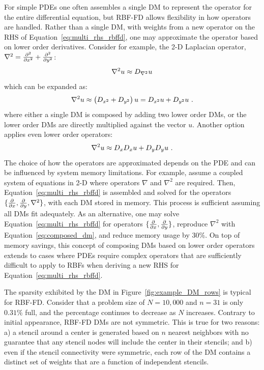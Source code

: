 \documentclass[11pt]{report}
\begin{document}
{For simple PDEs one often assembles a single DM to represent the operator for the entire differential equation, but RBF-FD allows flexibility in how operators are handled. Rather than a single DM, with weights from a new operator on the RHS of Equation~\ref{eq:multi_rhs_rbffd}, one may approximate the operator based on lower order derivatives. Consider for example, the 2-D Laplacian operator, $\nabla^2 = \frac{\partial^2 }{\partial x^2} + \frac{\partial^2 }{\partial y^2} $: 
\begin{align*}
\nabla^2 u \approx D_{\nabla^2 } u
\end{align*}
which can be expanded as: 
\begin{align*}
\nabla^2 u \approx \left(D_{x^2} + D_{y^2}\right) u = D_{x^2} u + D_{y^2} u \ .
\end{align*}
where either a single DM is composed by adding two lower order DMs, or the lower order DMs are directly multiplied against the vector $u$. Another option applies even lower order operators:
\begin{align}
\nabla^2 u \approx D_{x} D_{x} u + D_{y} D_{y} u \label{eq:composed_dm}\ .
\end{align}
The choice of how the operators are approximated depends on the PDE and can be influenced by system memory limitations. For example, assume a coupled system of equations in 2-D where operators $\nabla$ and $\nabla^2$ are required. Then, Equation~\ref{eq:multi_rhs_rbffd} is assembled and solved for the operators $\{\frac{\partial }{\partial x}, \frac{\partial }{\partial y}, \nabla^2\}$, with each DM stored in memory. This process is sufficient assuming all DMs fit adequately. As an alternative, one may solve Equation~\ref{eq:multi_rhs_rbffd} for operators $\{\frac{\partial }{\partial x}, \frac{\partial }{\partial y}\}$, reproduce $\nabla^2$ with Equation~\ref{eq:composed_dm}, and reduce memory usage by 30\%. 
On top of memory savings, this concept of composing DMs based on lower order operators extends to cases where PDEs require complex operators that are sufficiently difficult to apply to RBFs when deriving a new RHS for Equation~\ref{eq:multi_rhs_rbffd}.  
 

The sparsity exhibited by the DM in Figure~\ref{fig:example_DM_rows} is typical for RBF-FD. Consider that a problem size of $N=10,000$ and $n=31$ is only $0.31\%$ full, and the percentage continues to decrease as $N$ increases. Contrary to initial appearance, RBF-FD DMs are not symmetric. This is true for two reasons: a) a stencil around a center is generated based on $n$ nearest neighbors with no guarantee that any stencil nodes will include the center in their stencils; and  b) even if the stencil connectivity were symmetric, each row of the DM contains a distinct set of weights that are a function of independent stencils.

}
\end{document}
